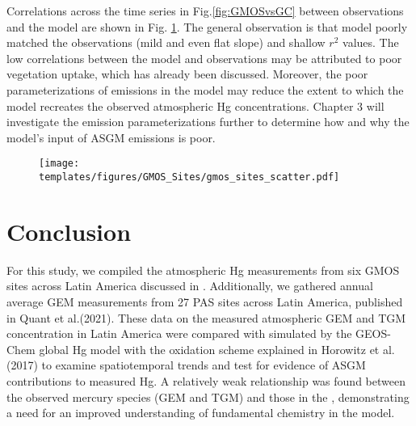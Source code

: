 \begin{flushleft}
 Correlations across the time series in Fig.\ref{fig:GMOSvsGC} between observations and the model are shown in Fig. \ref{fig:gmos_sites_scatter}. The general observation is that model poorly matched the observations (mild and even flat slope)  and shallow $r^2$ values. The low correlations between the model and observations may be attributed to poor vegetation uptake, which has already been discussed\cite{feinberg_evaluating_2022}. Moreover, the poor parameterizations of emissions in the model may reduce the extent to which the model recreates the observed atmospheric Hg concentrations. Chapter 3 will investigate the emission parameterizations further to determine how and why the model's input of ASGM emissions is poor. 
\end{flushleft}
 \begin{figure}[H]
\texttt{[image: templates/figures/GMOS\_Sites/gmos\_sites\_scatter.pdf]}
\centering
{}
\label{fig:gmos_sites_scatter}
\end{figure}
\FloatBarrier


\section{Conclusion}\label{c2_conclusion}

\begin{flushleft}
For this study, we compiled the atmospheric Hg measurements from six GMOS sites across Latin America discussed in \cite{koenig_seasonal_2021,sprovieri_atmospheric_2016}. Additionally, we gathered annual average GEM measurements from 27 PAS sites across Latin America, published in Quant et al.(2021). These data on the measured atmospheric GEM and TGM concentration in Latin America were compared with \hgc simulated by the GEOS-Chem global Hg model with the oxidation scheme explained in Horowitz et al. (2017) to examine spatiotemporal trends and test for evidence of ASGM contributions to measured Hg. A relatively weak relationship was found between the observed mercury species (GEM and TGM) and those in the \on, demonstrating a need for an improved understanding of fundamental chemistry in the \gc model.

\end{flushleft}